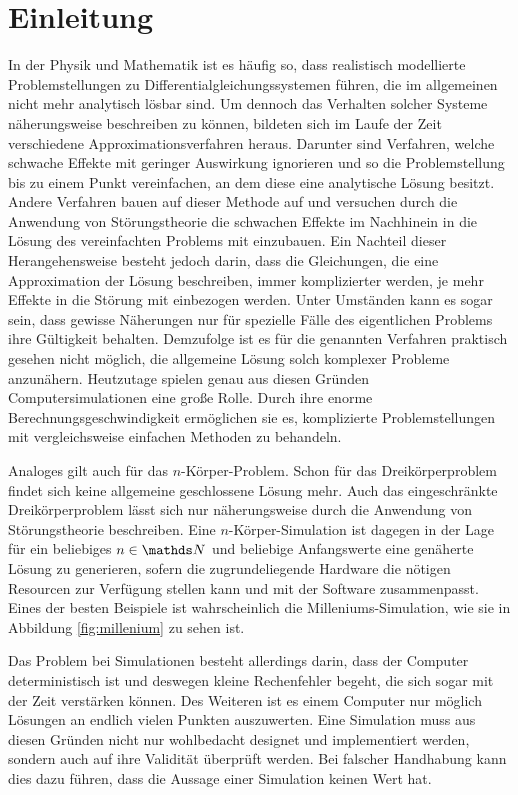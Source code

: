 \section{Einleitung} %
\label{sec:einleitung}

  In der Physik und Mathematik ist es häufig so, dass realistisch modellierte Problemstellungen zu Differentialgleichungssystemen führen, die im allgemeinen nicht mehr analytisch lösbar sind.
  Um dennoch das Verhalten solcher Systeme näherungsweise beschreiben zu können, bildeten sich im Laufe der Zeit verschiedene Approximationsverfahren heraus.
  Darunter sind Verfahren, welche schwache Effekte mit geringer Auswirkung ignorieren und so die Problemstellung bis zu einem Punkt vereinfachen, an dem diese eine analytische Lösung besitzt.
  Andere Verfahren bauen auf dieser Methode auf und versuchen durch die Anwendung von Störungstheorie die schwachen Effekte im Nachhinein in die Lösung des vereinfachten Problems mit einzubauen.
  Ein Nachteil dieser Herangehensweise besteht jedoch darin, dass die Gleichungen, die eine Approximation der Lösung beschreiben, immer komplizierter werden, je mehr Effekte in die Störung mit einbezogen werden.
  Unter Umständen kann es sogar sein, dass gewisse Näherungen nur für spezielle Fälle des eigentlichen Problems ihre Gültigkeit behalten.
  Demzufolge ist es für die genannten Verfahren praktisch gesehen nicht möglich, die allgemeine Lösung solch komplexer Probleme anzunähern.
  Heutzutage spielen genau aus diesen Gründen Computersimulationen eine große Rolle.
  Durch ihre enorme Berechnungsgeschwindigkeit ermöglichen sie es, komplizierte Problemstellungen mit vergleichsweise einfachen Methoden zu behandeln.

  Analoges gilt auch für das $n$-Körper-Problem.
  Schon für das Dreikörperproblem findet sich keine allgemeine geschlossene Lösung mehr.
  Auch das eingeschränkte Dreikörperproblem lässt sich nur näherungsweise durch die Anwendung von Störungstheorie beschreiben.
  Eine $n$-Körper-Simulation ist dagegen in der Lage für ein beliebiges $n\in\setNatural$ und beliebige Anfangswerte eine genäherte Lösung zu generieren, sofern die zugrundeliegende Hardware die nötigen Resourcen zur Verfügung stellen kann und mit der Software zusammenpasst.
  Eines der besten Beispiele ist wahrscheinlich die Milleniums-Simulation, wie sie in Abbildung \ref{fig:millenium} zu sehen ist.

  Das Problem bei Simulationen besteht allerdings darin, dass der Computer deterministisch ist und deswegen kleine Rechenfehler begeht, die sich sogar mit der Zeit verstärken können.
  Des Weiteren ist es einem Computer nur möglich Lösungen an endlich vielen Punkten auszuwerten.
  Eine Simulation muss aus diesen Gründen nicht nur wohlbedacht designet und implementiert werden, sondern auch auf ihre Validität überprüft werden.
  Bei falscher Handhabung kann dies dazu führen, dass die Aussage einer Simulation keinen Wert hat.

